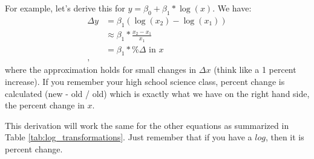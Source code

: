 \documentclass[12pt]{article}
\begin{document}
For example, let's derive this for $y = \beta_0 + \beta_1 * \log(x)$. We have:
\begin{align*}
  \Delta y &= \beta_1 \left( \log(x_2) - \log(x_1) \right) \\
  &\approx \beta_1 * \frac{x_2 - x_1}{x_1} \\
  &= \beta_1 * \% \Delta \text{ in } x \\, 
\end{align*}
where the approximation holds for small changes in $\Delta x$ (think like a 1 percent increase). If you remember your high school science class, percent change is calculated (new - old / old) which is exactly what we have on the right hand side, the percent change in $x$. 

This derivation will work the same for the other equations as summarized in Table \ref{tab:log_transformations}. Just remember that if you have a $log$, then it is percent change.
\end{document}
